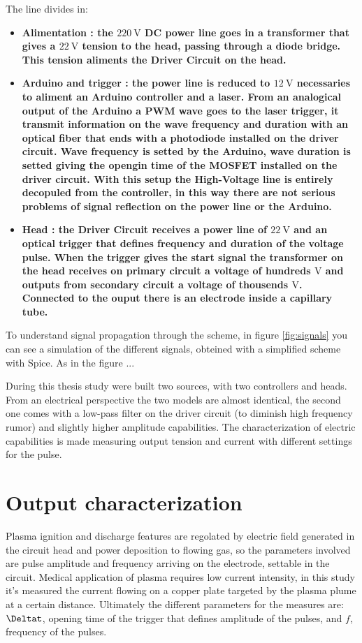The line divides in:
\begin{itemize}
 \item \bf{Alimentation} : the $\SI{220}{\volt}$ DC power line goes in a transformer that gives a $\SI{22}{\volt}$ tension to the head, passing through a diode bridge. This tension aliments the Driver Circuit on the head.
 \item \bf{Arduino and trigger} : the power line is reduced to $\SI{12}{\volt}$ necessaries to aliment an Arduino controller and a laser. From an analogical output of the Arduino a PWM wave goes to the laser trigger, it transmit information on the wave frequency and duration with an optical fiber that ends with a photodiode installed on the driver circuit. Wave frequency is setted by the Arduino, wave duration is setted giving the opengin time of the MOSFET installed on the driver circuit. With this setup the High-Voltage line is entirely decopuled from the controller, in this way there are not serious problems of signal reflection on the power line or the Arduino.
 \item \bf{Head} : the Driver Circuit receives a power line of $\SI{22}{\volt}$ and an optical trigger that defines frequency and duration of the voltage pulse. When the trigger gives the start signal the transformer on the head receives on primary circuit a voltage of hundreds $\si{\volt}$ and outputs from secondary circuit a voltage of thousends $\si{\volt}$. Connected to the ouput there is an electrode inside a capillary tube.
\end{itemize}


To understand signal propagation through the scheme, in figure \ref{fig:signals} you can see a simulation of the different signals, obteined with a simplified scheme with Spice. As in the figure ...

During this thesis study were built two sources, with two controllers and heads. From an electrical perspective the two models are almost identical, the second one comes with a low-pass filter on the driver circuit (to diminish high frequency rumor) and slightly higher amplitude capabilities.
The characterization of electric capabilities is made measuring output tension and current with different settings for the pulse.

\section{Output characterization}
Plasma ignition and discharge features are regolated by electric field generated in the circuit head and power deposition to flowing gas, so the parameters involved are pulse amplitude and frequency arriving on the electrode, settable in the circuit. Medical application of plasma requires low current intensity, in this study it's measured the current flowing on a copper plate targeted by the plasma plume at a certain distance. Ultimately the different parameters for the measures are: $\Deltat$, opening time of the trigger that defines amplitude of the pulses, and $f$, frequency of the pulses. 

